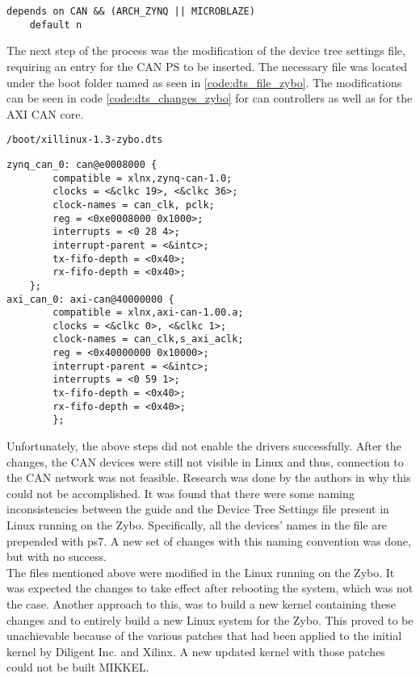 \begin{lstlisting}[firstnumber=130,caption={Original content of lines 130 and 131.},label={code:can_kconfig_original_line130}]
	depends on CAN && (ARCH_ZYNQ || MICROBLAZE)
	default n
\end{lstlisting}

The next step of the process was the modification of the device tree settings file, requiring an entry for the CAN PS to be inserted.
The necessary file was located under the boot folder named as seen in \ref{code:dts_file_zybo}.
The modifications can be seen in code \ref{code:dts_changes_zybo} for can controllers as well as for the AXI CAN core.

\begin{lstlisting}[numbers=none,caption={Device tree settings file and its path.},label={code:dts_file_zybo}]
/boot/xillinux-1.3-zybo.dts
\end{lstlisting}
\begin{lstlisting}[caption={Device tree settings changes.},label={code:dts_changes_zybo}]
zynq_can_0: can@e0008000 {
        compatible = xlnx,zynq-can-1.0;
        clocks = <&clkc 19>, <&clkc 36>;
        clock-names = can_clk, pclk;
        reg = <0xe0008000 0x1000>;
        interrupts = <0 28 4>;
        interrupt-parent = <&intc>;
        tx-fifo-depth = <0x40>;
        rx-fifo-depth = <0x40>;
    };
axi_can_0: axi-can@40000000 {
        compatible = xlnx,axi-can-1.00.a;
        clocks = <&clkc 0>, <&clkc 1>;
        clock-names = can_clk,s_axi_aclk;
        reg = <0x40000000 0x10000>;
        interrupt-parent = <&intc>;
        interrupts = <0 59 1>;
        tx-fifo-depth = <0x40>;
        rx-fifo-depth = <0x40>;
        };
\end{lstlisting}

Unfortunately, the above steps did not enable the drivers successfully.
After the changes, the CAN devices were still not visible in Linux and thus, connection to the CAN network was not feasible.
Research was done by the authors in why this could not be accomplished.
It was found that there were some naming inconsistencies between the guide and the Device Tree Settings file present in Linux running on the Zybo. Specifically, all the devices' names in the file are prepended with ps7.
A new set of changes with this naming convention was done, but with no success.\\

The files mentioned above were modified in the Linux running on the Zybo.
It was expected the changes to take effect after rebooting the system, which was not the case.
Another approach to this, was to build a new kernel containing these changes and to entirely build a new Linux system for the Zybo.
This proved to be unachievable because of the various patches that had been applied to the initial kernel by Diligent Inc. and Xilinx.
A new updated kernel with those patches could not be built MIKKEL.

